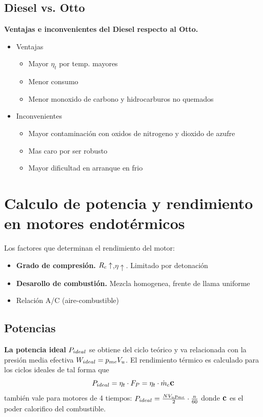 \subsection{Diesel vs. Otto}
\textbf{Ventajas e inconvenientes del Diesel respecto al Otto.}

\begin{itemize}
    \item Ventajas
    \begin{itemize}
        \item Mayor $\eta_t$ por temp. mayores
        \item Menor consumo
        \item Menor monoxido de carbono y hidrocarburos no quemados
    \end{itemize}
    \item Inconvenientes
    \begin{itemize}
        \item Mayor contaminación con oxidos de nitrogeno y dioxido de azufre
        \item Mas caro por ser robusto
        \item Mayor dificultad en arranque en frio
    \end{itemize}
    
\end{itemize}
\section{Calculo de potencia y rendimiento en motores endotérmicos}
Los factores que determinan el rendimiento del motor:
\begin{itemize}
    \item \textbf{Grado de compresión.} $R_c \uparrow$,$\eta \uparrow$. Limitado por detonación
    \item \textbf{Desarollo de combustión.} Mezcla homogenea, frente de llama uniforme
    \item Relación A/C (aire-combustible)
\end{itemize}

\subsection{Potencias}
\textbf{La potencia ideal} $P_{ideal}$ se obtiene del ciclo teórico y va relacionada con la presión media efectiva $W_{ideal} = p_{me} V_u$. El rendimiento térmico es calculado para los ciclos ideales de tal forma que  
\[
P_{ideal}=\eta_t\cdot F_P=\eta_t \cdot \dot{m}_c \mbox{\large$\mathbf{c}$}
\]
también vale para motores de 4 tiempos: $P_{ideal}=\frac{N V_u p_{me}}{2}\cdot \frac{n}{60}$
donde $\mbox{\large$\mathbf{c}$}$ es el poder calorifico del combustible.

